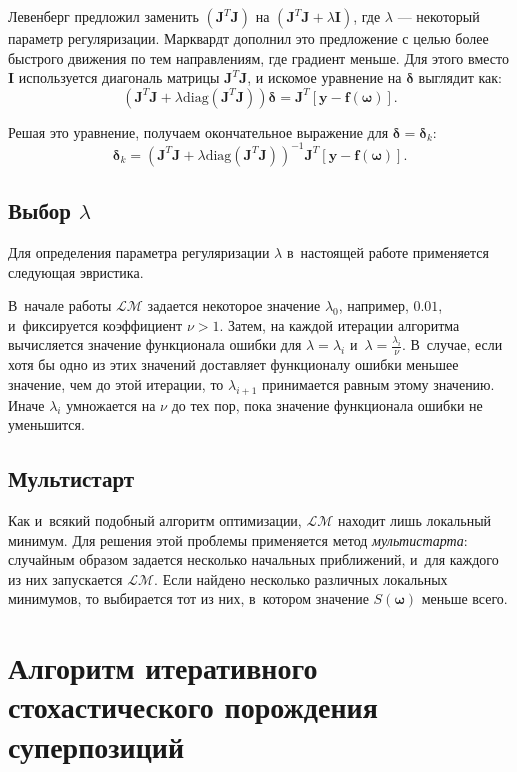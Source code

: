 \documentclass[12pt,a4paper]{amsart}
\begin{document}
Левенберг предложил заменить $(\mathbf{J}^T\mathbf{J})$ на
$(\mathbf{J}^T\mathbf{J} + \lambda\mathbf{I})$, где $\lambda$ --- некоторый
параметр регуляризации. Марквардт дополнил это предложение с целью более
быстрого движения по тем направлениям, где градиент меньше. Для этого вместо
$\mathbf{I}$ используется диагональ матрицы $\mathbf{J}^T\mathbf{J}$, и
искомое уравнение на $\boldsymbol{\delta}$ выглядит как:
\[
(\mathbf{J}^T\mathbf{J} + \lambda \text{diag} (\mathbf{J}^T\mathbf{J}))\boldsymbol{\delta} = \mathbf{J}^T [\mathbf{y - f(\boldsymbol{\omega})}].
\]

Решая это уравнение, получаем окончательное выражение для
$\boldsymbol{\delta} = \boldsymbol{\delta}_k$:
\[
\boldsymbol{\delta}_k = (\mathbf{J}^T\mathbf{J} + \lambda \text{diag} (\mathbf{J}^T\mathbf{J}))^{-1} \mathbf{J}^T [\mathbf{y - f(\boldsymbol{\omega})}].
\]

\subsection{Выбор $\lambda$}

Для определения параметра регуляризации $\lambda$ в~настоящей работе
применяется следующая эвристика.

В~начале работы $\mathcal{LM}$ задается некоторое значение $\lambda_0$,
например, $0.01$, и~фиксируется коэффициент $\nu > 1$. Затем, на каждой
итерации алгоритма вычисляется значение функционала ошибки для
$\lambda = \lambda_i$ и~$\lambda = \frac{\lambda_i}{\nu}$. В~случае,
если хотя бы одно из этих значений доставляет функционалу ошибки
меньшее значение, чем до этой итерации, то $\lambda_{i+1}$ принимается
равным этому значению. Иначе $\lambda_i$ умножается на $\nu$ до тех
пор, пока значение функционала ошибки не уменьшится.

\subsection{Мультистарт}

Как и~всякий подобный алгоритм оптимизации, $\mathcal{LM}$ находит лишь
локальный минимум. Для решения этой проблемы применяется метод \emph{мультистарта}:
случайным образом задается несколько начальных приближений, и~для каждого из
них запускается $\mathcal{LM}$. Если найдено несколько различных локальных
минимумов, то выбирается тот из них, в~котором значение $S(\boldsymbol{\omega})$
меньше всего.

\section{Алгоритм итеративного стохастического порождения суперпозиций}
\end{document}
